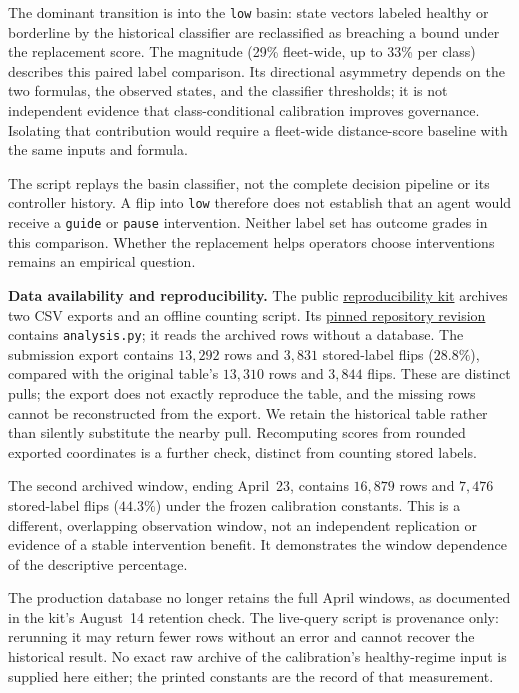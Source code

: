 \documentclass[11pt,twocolumn]{article}
\begin{document}
The dominant transition is into the \texttt{low} basin: state
vectors labeled healthy or borderline by the historical classifier
are reclassified as breaching a bound under the replacement score.
The magnitude (29\% fleet-wide, up to 33\% per class) describes
this paired label comparison. Its directional asymmetry depends
on the two formulas, the observed states, and the classifier
thresholds; it is not independent evidence that class-conditional
calibration improves governance. Isolating that contribution would
require a fleet-wide distance-score baseline with the same inputs
and formula.

The script replays the basin classifier, not the complete decision
pipeline or its controller history. A flip into \texttt{low}
therefore does not establish that an agent would receive a
\texttt{guide} or \texttt{pause} intervention. Neither label set
has outcome grades in this comparison. Whether the replacement
helps operators choose interventions remains an empirical question.

\textbf{Data availability and reproducibility.} The public
\href{https://doi.org/10.5281/zenodo.19705151}{reproducibility kit}
archives two CSV exports and an offline counting script. Its
\href{https://github.com/cirwel/unitares-repro-v6/tree/2d6955bf69877f2a2baa343928376896a5e254a9}{pinned repository revision}
contains \texttt{analysis.py}; it reads the archived rows without
a database. The submission export contains $13{,}292$ rows and
$3{,}831$ stored-label flips ($28.8\%$), compared with the original
table's $13{,}310$ rows and $3{,}844$ flips. These are distinct pulls;
the export does not exactly reproduce the table, and the missing
rows cannot be reconstructed from the export. We retain the
historical table rather than silently substitute the nearby pull.
Recomputing scores from rounded exported coordinates is a further
check, distinct from counting stored labels.

The second archived window, ending April~23, contains $16{,}879$
rows and $7{,}476$ stored-label flips ($44.3\%$) under the frozen
calibration constants. This is a different, overlapping observation
window, not an independent replication or evidence of a stable
intervention benefit. It demonstrates the window dependence of
the descriptive percentage.

The production database no longer retains the full April windows,
as documented in the kit's August~14 retention check. The live-query
script is provenance only: rerunning it may return fewer rows
without an error and cannot recover the historical result.
No exact raw archive of the calibration's healthy-regime input
is supplied here either; the printed constants are the record of
that measurement.
\end{document}
